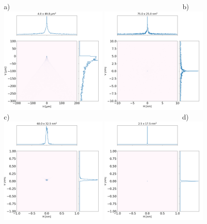 \documentclass{iucr}              %
\begin{document}
\begin{figure}\label{fig:bl}
\centering
\flushleft
a)~~~~~~~~~~~~~~~~~~~~~~~~~~~~~~~~~~~~~~~~~~~~~~~~~~~b)\\
\includegraphics[width=0.48\textwidth]{figures/bl_point_toroid.png}
\includegraphics[width=0.48\textwidth]{figures/bl_point_parabolic-cone.png} \\
c)~~~~~~~~~~~~~~~~~~~~~~~~~~~~~~~~~~~~~~~~~~~~~~~~~~~d)\\
\includegraphics[width=0.48\textwidth]{figures/bl_point_diaboloid.png}
\includegraphics[width=0.48\textwidth]{figures/bl_point_diaboloid-exact.png}

\end{figure}
\end{document}
